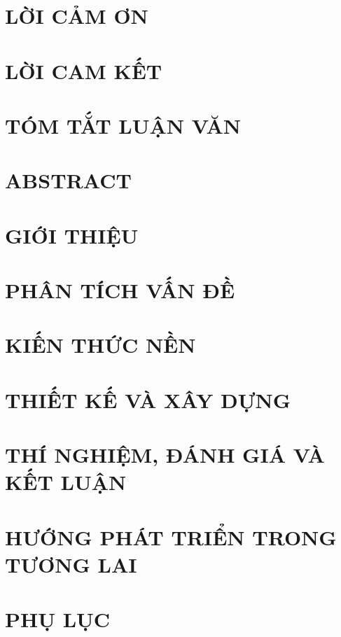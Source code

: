 \documentclass[14pt]{hcmutarticle}
\newcommand\blankpage{
    \null
    \thispagestyle{empty}
    \addtocounter{page}{-1}
    \newpage}
\begin{document}



\afterpage{\blankpage}

\setcounter{secnumdepth}{-2}

\newpage
\chapter{LỜI CẢM ƠN}


\newpage
\chapter{LỜI CAM KẾT}


\newpage
\chapter{TÓM TẮT LUẬN VĂN}


\newpage
\chapter{ABSTRACT}


\newpage
\tableofcontents
\setcounter{secnumdepth}{5}

\newpage
\listoffigures

\newpage
\listoftables

\newpage
{}

\chapter{GIỚI THIỆU}


\newpage
\chapter{PHÂN TÍCH VẤN ĐỀ}


\newpage
\chapter{KIẾN THỨC NỀN}


\newpage
\chapter{THIẾT KẾ VÀ XÂY DỰNG}


\newpage
\chapter{THÍ NGHIỆM, ĐÁNH GIÁ VÀ KẾT LUẬN}


\newpage
\chapter{HƯỚNG PHÁT TRIỂN TRONG TƯƠNG LAI}


\newpage
\chapter{PHỤ LỤC}

\end{document}
